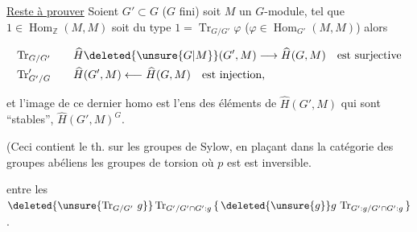 \uline{Reste à prouver} Soient $G'\subset G$ ($G$ fini) soit $M$ un $G$-module, tel que $1\in\operatorname{Hom}_{\mathbb Z}(M,M)$ soit du type $1=\operatorname{Tr}_{G/G'}\varphi$  ($\varphi\in\operatorname{Hom}_{G'}(M,M)$) alors

\[\begin{aligned}
\operatorname{Tr}_{G/G'}\qquad &\widehat H\deleted{\unsure{G|M}}(G',M)\longrightarrow\widehat H(G,M)\quad\text{est surjective}\\
\operatorname{Tr}'_{G'/G}\qquad &\widehat H(G',M)\longleftarrow\widehat H(G,M)\quad\text{est injection,}
\end{aligned}\]

et l'image de ce dernier homo est l'ens des éléments de $\widehat H(G',M)$ qui sont ``stables'',  $\widehat H(G',M)^G$.


(Ceci contient le th. sur les groupes de Sylow, en plaçant dans la catégorie des groupes abéliens   les groupes de torsion où $p$ est est inversible.

 entre les  $\deleted{\unsure{\operatorname{Tr}_{G/G'}\,g}}\operatorname{Tr}_{G'/G'\cap G':g}\,\{\,\deleted{\unsure{g}}g\,\operatorname{Tr}_{G':g/G'\cap G':g}\,\}$.


